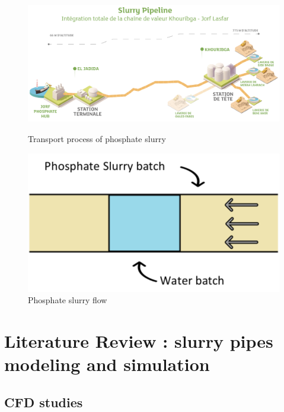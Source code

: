 \documentclass[review,3p,times,12pt]{elsarticle}
\begin{document}
\begin{figure}[h!]
   \begin{center}
    \includegraphics[trim=0cm 0cm 0cm 0cm,clip,width=12cm,height=6cm]{pipe.png}
    \caption{Transport process of phosphate slurry }
    \label{fig:gauss}
       \end{center}
\end{figure} 

\begin{figure}[h!]
   \begin{center}
    \includegraphics[trim=0cm 0cm 0cm 0cm,clip,scale= 0.5]{batch.png}
    \caption{Phosphate slurry flow}
    \label{fig:gauss}
       \end{center}
\end{figure} 
\section{Literature Review : slurry pipes modeling and simulation}
\subsection{CFD studies}
\end{document}
